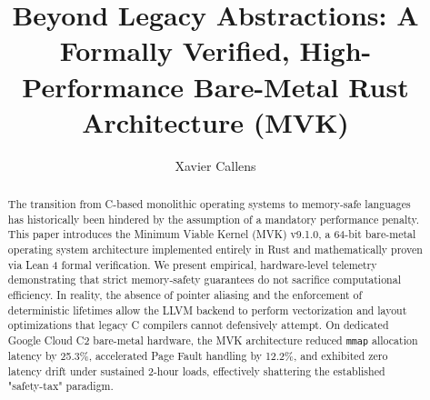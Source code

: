\documentclass[sigconf]{acmart}
\begin{document}
\title{Beyond Legacy Abstractions: A Formally Verified, High-Performance Bare-Metal Rust Architecture (MVK)}

\author{Xavier Callens}

\begin{abstract}
The transition from C-based monolithic operating systems to memory-safe languages has historically been hindered by the assumption of a mandatory performance penalty. This paper introduces the Minimum Viable Kernel (MVK) v9.1.0, a 64-bit bare-metal operating system architecture implemented entirely in Rust and mathematically proven via Lean 4 formal verification. We present empirical, hardware-level telemetry demonstrating that strict memory-safety guarantees do not sacrifice computational efficiency. In reality, the absence of pointer aliasing and the enforcement of deterministic lifetimes allow the LLVM backend to perform vectorization and layout optimizations that legacy C compilers cannot defensively attempt. On dedicated Google Cloud C2 bare-metal hardware, the MVK architecture reduced \texttt{mmap} allocation latency by 25.3\%, accelerated Page Fault handling by 12.2\%, and exhibited zero latency drift under sustained 2-hour loads, effectively shattering the established "safety-tax" paradigm.
\end{abstract}


\maketitle

\begin{center}
\end{center}
\bigskip
\end{document}
